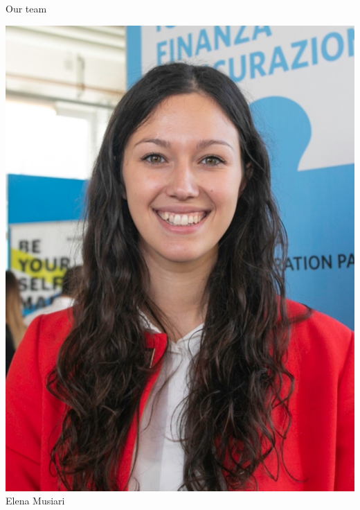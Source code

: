 \documentclass{beamer}
\begin{document}
\begin{frame}{Our team}
\begin{minipage}{0.24\textwidth}
\begin{center}
			\includegraphics[width=\columnwidth]{elenataglio.jpg}
			Elena Musiari
		\end{center}
	\end{minipage}
\hfill
	\begin{minipage}{0.24\textwidth}
		\begin{center}%

\end{center}
\end{minipage}
\end{frame}
\end{document}
